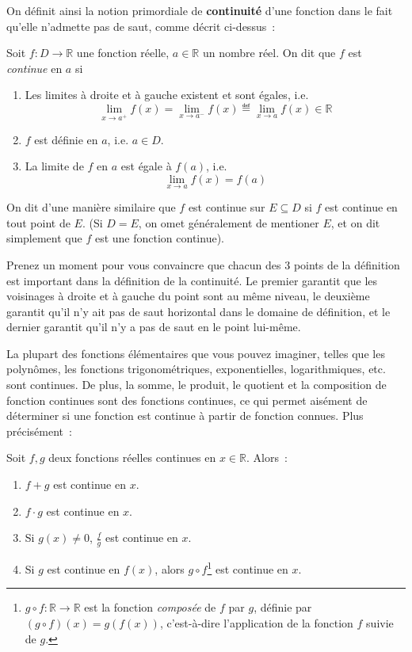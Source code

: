 On définit ainsi la notion primordiale de \textbf{continuité} d'une fonction dans le fait qu'elle n'admette pas de saut, comme décrit ci-dessus~:
\begin{boxdef}[Continuité]\label{def:continuité}
Soit $f : D \to \mathbb{R}$ une fonction réelle, $a \in \mathbb{R}$ un nombre réel. On dit que $f$ est \emph{continue} en $a$ si
\begin{enumerate}
    \item Les limites à droite et à gauche existent et sont égales, i.e.
    \begin{equation}
    \lim_{x \to a^+} f(x) = \lim_{x \to a^-} f(x) \eqdef \lim_{x \to a} f(x) \in \mathbb{R}
    \end{equation}
    
    \item $f$ est définie en $a$, i.e. $a \in D$.
    
    \item La limite de $f$ en $a$ est égale à $f(a)$, i.e.
    \begin{equation}
    \lim_{x \to a} f(x) = f(a)
    \end{equation}
\end{enumerate}
On dit d'une manière similaire que $f$ est continue sur $E \subseteq D$ si $f$ est continue en tout point de $E$. (Si $D = E$, on omet généralement de mentioner $E$, et on dit simplement que $f$ est une fonction continue).
\end{boxdef}
Prenez un moment pour vous convaincre que chacun des 3 points de la définition est important dans la définition de la continuité. Le premier garantit que les voisinages à droite et à gauche du point sont au même niveau, le deuxième garantit qu'il n'y ait pas de saut horizontal dans le domaine de définition, et le dernier garantit qu'il n'y a pas de saut en le point lui-même.

La plupart des fonctions élémentaires que vous pouvez imaginer, telles que les polynômes, les fonctions trigonométriques, exponentielles, logarithmiques, etc. sont continues. De plus, la somme, le produit, le quotient et la composition de fonction continues sont des fonctions continues, ce qui permet aisément de déterminer si une fonction est continue à partir de fonction connues. Plus précisément~:
\begin{boxthm}
Soit $f, g$ deux fonctions réelles continues en $x \in \mathbb{R}$. Alors~:
\begin{enumerate}
    \item $f + g$ est continue en $x$.
    \item $f \cdot g$ est continue en $x$.
    \item Si $g(x) \neq 0$, $\frac{f}{g}$ est continue en $x$.
    \item Si $g$ est continue en $f(x)$, alors $g \circ f$\footnote{$g \circ f : \mathbb{R} \to \mathbb{R}$ est la fonction \emph{composée} de $f$ par $g$, définie par $(g \circ f)(x) = g(f(x))$, c'est-à-dire l'application de la fonction $f$ suivie de $g$.} est continue en $x$.
\end{enumerate}
\end{boxthm}

